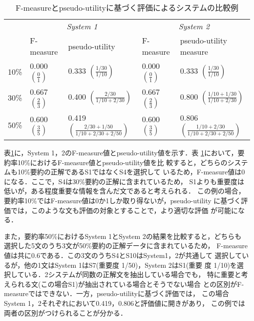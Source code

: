 \begin{table}[t]
\caption{F-measureとpseudo-utilityに基づく評価によるシステムの比較例\label{table:exp2}}
\begin{center}
{\scriptsize
\begin{tabular}{|c||l|l|l|l|}\hline
 & \multicolumn{2}{c|}{\it System 1} & \multicolumn{2}{c|}{\it System 2}\\\cline{2-5}
     & F-measure & pseudo-utility & F-measure & pseudo-utility measure\\ \hline\hline
10\% & 0.000 \(\displaystyle (\frac{0}{1})\) & 0.333 \(\displaystyle (\frac{1/30}{1/10})\) & 0.000 \(\displaystyle (\frac{0}{1})\) & 0.333 \(\displaystyle (\frac{1/30}{1/10})\)\\ \hline
30\% & 0.667 \(\displaystyle (\frac{2}{3})\) & 0.400 \(\displaystyle (\frac{2/30}{1/10 + 2/30})\) & 
 0.667 \(\displaystyle (\frac{2}{3})\) & 0.800 \(\displaystyle (\frac{1/10 + 1/30}{1/10 + 2/30})\)\\ \hline
50\% & 0.600 \(\displaystyle (\frac{3}{5})\) & 0.419 \(\displaystyle (\frac{2/30 + 1/50}{1/10 + 2/30 + 2/50})\) & 
 0.600 \(\displaystyle (\frac{3}{5})\) & 0.806 \(\displaystyle (\frac{1/10 + 2/30}{1/10 + 2/30 + 2/50})\)\\ \hline
\end{tabular}
}
\end{center}
\end{table}

表\ref{table:exp2}に，System 1，2のF-measure値とpseudo-utility値を示す．表
\ref{table:exp2}において，要約率10\%におけるF-measure値とpseudo-utility値を比
較すると，どちらのシステムも10\%要約の正解であるS1ではなくS4を選択して
いるため，F-measure値は0になる．ここで，S4は30\%要約の正解に含まれているため，
S1よりも重要度は低いが，ある程度重要な情報を含んだ文であると考えられる．
この例の場合，要約率10\%ではF-measure値は0か1しか取り得ないが，pseudo-utility
に基づく評価では，このような文も評価の対象とすることで，より適切な評価
が可能になる．

また，要約率50\%におけるSystem 1とSystem 2の結果を比較すると，どちらも
選択した5文のうち3文が50\%要約の正解データに含まれているため，
F-measure値は共に0.6である．この3文のうちS4とS10はSystem1，2が共通して
選択しているが，他の1文はSystem 1はS7(重要度 1/50)，System 2はS1(重要
度 1/10)を選択している．2システムが同数の正解文を抽出している場合でも，
特に重要と考えられる文(この場合S1)が抽出されている場合とそうでない場合
との区別がF-measureではできない．一方，pseudo-utilityに基づく評価では，
この場合System 1，2それぞれにおいて0.419，0.806と評価値に開きがあり，
この例では両者の区別がつけられることが分かる．

